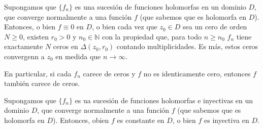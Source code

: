 \begin{teo}[De Hurwitz (I)]
    Supongamos que $\{f_n\}$ es una sucesión de funciones holomorfas en un dominio $D$, que converge normalmente a una función $f$ (que sabemos que es holomorfa en $D$). Entonces, o bien $f \equiv 0$ en $D$, o bien cada vez que $z_0 \in D$ sea un cero de orden $N \ge 0$, existen $r_0 > 0$ y $n_0 \in \mathbb{N}$ con la propiedad que, para todo $n \ge n_0$ $f_n$ tiene exactamente $N$ ceros en $\Delta(z_0,r_0)$ contando multiplicidades. Es más, estos ceros convergenn a  $z_0$ en medida que $n \to \infty$.

    En particular, si cada $f_n$ carece de ceros y $f$ no es identicamente cero, entonces $f$ también carece de ceros.
\end{teo}

\begin{teo}[De Hurwitz (II)]
    Supongamos que $\{f_n\}$ es ua sucesión de funciones holomorfas e inyectivas en un dominio $D$, que converge normalmente a una función $f$ (que sabemos que es holomorfa en $D$). Entonces, obien $f$ es constante en $D$, o bien $f$ es inyectiva en $D$.
\end{teo}